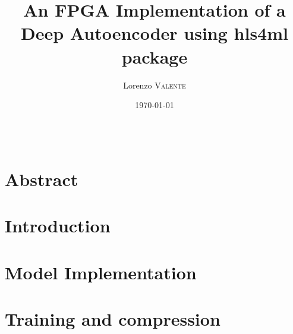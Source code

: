 \documentclass{article}
\title{\textbf{An FPGA Implementation of a\\ Deep Autoencoder using hls4ml package}} %
\author{Lorenzo \textsc{Valente}} %
\date{\today} %
\begin{document}
\maketitle %

\begin{center}
\begin{tabular}{l r}
\end{tabular}
\end{center}



\section*{Abstract}



\section{Introduction}




\section{Model Implementation}




\section{Training and compression}
\end{document}
